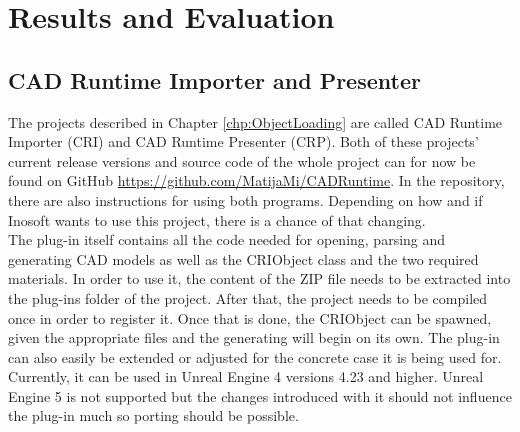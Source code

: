 \chapter{Results and Evaluation}\label{chp:Results}

\section{CAD Runtime Importer and Presenter}

The projects described in Chapter \ref{chp:ObjectLoading} are called CAD Runtime Importer (\acs{CRI}) and CAD Runtime Presenter (\acs{CRP}). Both of these projects' current release versions and source code of the whole project can for now be found on GitHub \url{https://github.com/MatijaMi/CADRuntime}. In the repository, there are also instructions for using both programs. Depending on how and if Inosoft wants to use this project, there is a chance of that changing.\\
The plug-in itself contains all the code needed for opening, parsing and generating CAD models as well as the CRIObject class and the two required materials. In order to use it, the content of the ZIP file needs to be extracted into the plug-ins folder of the project. After that, the project needs to be compiled once in order to register it. Once that is done, the CRIObject can be spawned, given the appropriate files and the generating will begin on its own. The plug-in can also easily be extended or adjusted for the concrete case it is being used for. Currently, it can be used in Unreal Engine 4 versions 4.23 and higher. Unreal Engine 5 is not supported but the changes introduced with it should not influence the plug-in much so porting should be possible.\\
